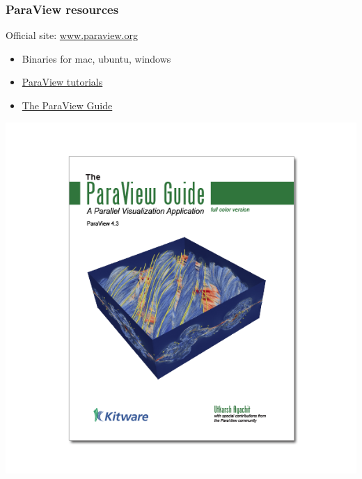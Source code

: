 \begin{frame}[fragile]
\mbox{}



\begin{minipage}{0.59\textwidth}
\frametitle{ParaView resources}
  Official site: {\blue \url{www.paraview.org}}
  \begin{itemize}

    \item Binaries for mac, ubuntu, windows %

    \item {\blue \hyperlink{http://www.paraview.org/tutorials/}{ParaView tutorials}}

    \item {\blue \hyperlink{http://www.paraview.org/paraview-guide/}{The ParaView Guide}}
  \end{itemize}
\end{minipage}
  \begin{minipage}{0.3\textwidth}
    \begin{center}
      \includegraphics[width=\textwidth]{png/pv_book.png}
    \end{center}
  \end{minipage}




\end{frame}
